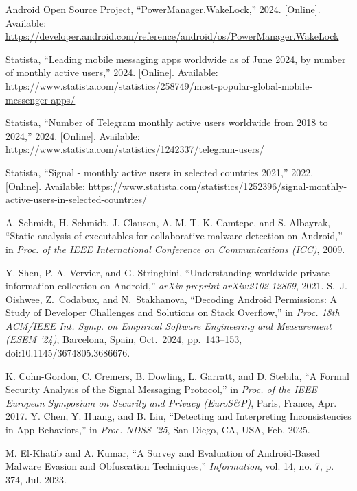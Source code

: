 \documentclass[a4paper,12pt]{report}
\begin{document}
\begin{thebibliography}{99}
Android Open Source Project, “PowerManager.WakeLock,” 2024. [Online]. Available: \url{https://developer.android.com/reference/android/os/PowerManager.WakeLock}

Statista, “Leading mobile messaging apps worldwide as of June 2024, by number of monthly active users,” 2024. [Online]. Available: \url{https://www.statista.com/statistics/258749/most-popular-global-mobile-messenger-apps/}

Statista, “Number of Telegram monthly active users worldwide from 2018 to 2024,” 2024. [Online]. Available: \url{https://www.statista.com/statistics/1242337/telegram-users/}

Statista, “Signal - monthly active users in selected countries 2021,” 2022. [Online]. Available: \url{https://www.statista.com/statistics/1252396/signal-monthly-active-users-in-selected-countries/}

A. Schmidt, H. Schmidt, J. Clausen, A. M. T. K. Camtepe, and S. Albayrak, “Static analysis of executables for collaborative malware detection on Android,” in \emph{Proc. of the IEEE International Conference on Communications (ICC)}, 2009.

Y. Shen, P.-A. Vervier, and G. Stringhini, ``Understanding worldwide private information collection on Android,'' \emph{arXiv preprint arXiv:2102.12869}, 2021.
S.~J. Oishwee, Z.~Codabux, and N.~Stakhanova, “Decoding Android Permissions: A Study of Developer Challenges and Solutions on Stack Overflow,” in \emph{Proc. 18th ACM/IEEE Int. Symp. on Empirical Software Engineering and Measurement (ESEM ’24)}, Barcelona, Spain, Oct. 2024, pp. 143–153, doi:10.1145/3674805.3686676.

K. Cohn-Gordon, C. Cremers, B. Dowling, L. Garratt, and D. Stebila, “A Formal Security Analysis of the Signal Messaging Protocol,” in \emph{Proc. of the IEEE European Symposium on Security and Privacy (EuroS\&P)}, Paris, France, Apr. 2017.
Y. Chen, Y. Huang, and B. Liu, “Detecting and Interpreting Inconsistencies in App Behaviors,” in \emph{Proc. NDSS ’25}, San Diego, CA, USA, Feb. 2025.

M. El‐Khatib and A. Kumar, “A Survey and Evaluation of Android‐Based Malware Evasion and Obfuscation Techniques,” \emph{Information}, vol. 14, no. 7, p. 374, Jul. 2023.


\end{thebibliography}
\end{document}
